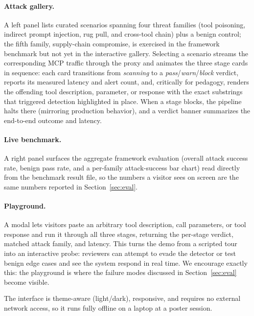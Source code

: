 \documentclass[11pt]{article}
\begin{document}
\paragraph{Attack gallery.}
A left panel lists curated scenarios spanning four threat families (tool poisoning,
indirect prompt injection, rug pull, and cross-tool chain) plus a benign control;
the fifth family, supply-chain compromise, is exercised in the framework benchmark
but not yet in the interactive gallery. Selecting a scenario streams the
corresponding MCP traffic through the proxy and animates the three stage cards in
sequence: each card transitions from \emph{scanning} to a
\emph{pass}/\emph{warn}/\emph{block} verdict, reports its measured latency and alert
count, and, critically for pedagogy, renders the offending tool description,
parameter, or response with the exact substrings that triggered detection
highlighted in place. When a stage blocks, the pipeline halts there (mirroring
production behavior), and a verdict banner summarizes the end-to-end outcome and
latency.

\paragraph{Live benchmark.}
A right panel surfaces the aggregate framework evaluation (overall attack success
rate, benign pass rate, and a per-family attack-success bar chart) read directly from
the benchmark result file, so the numbers a visitor sees on screen are the same
numbers reported in Section~\ref{sec:eval}.

\paragraph{Playground.}
A modal lets visitors paste an arbitrary tool description, call parameters, or tool
response and run it through all three stages, returning the per-stage verdict,
matched attack family, and latency. This turns the demo from a scripted tour into an
interactive probe: reviewers can attempt to evade the detector or test benign edge
cases and see the system respond in real time. We encourage exactly this: the
playground is where the failure modes discussed in Section~\ref{sec:eval} become
visible.

The interface is theme-aware (light/dark), responsive, and requires no external
network access, so it runs fully offline on a laptop at a poster session.
\end{document}
